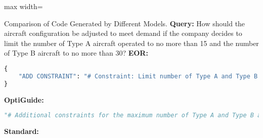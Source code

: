 \begin{figure*}[ht] \small
\begin{adjustbox}{max width=\textwidth}
\begin{AIbox}{Comparison of Code Generated by Different Models.}
{\bf Query:}
{\footnotesize
How should the aircraft configuration be adjusted to meet demand if the company decides to limit the number of Type A aircraft operated to no more than 15 and the number of Type B aircraft to no more than 30?
}
\tcbline
{\bf EOR:}
{\footnotesize
\begin{lstlisting}[language=Python]
{
    "ADD CONSTRAINT": "# Constraint: Limit number of Type A and Type B aircraft\nm.addConstr(aircraft_count['A'] <= 15, name=\"MaxTypeAConstraint\")\nm.addConstr(aircraft_count['B'] <= 30, name=\"MaxTypeBConstraint\")"
}
\end{lstlisting}
}
\tcbline
{\bf OptiGuide:}
{\footnotesize
\begin{lstlisting}[language=Python]
"# Additional constraints for the maximum number of Type A and Type B aircraft\nm.addConstr(aircraft_count['A'] <= 15, name=\"MaxAircraft_A\")\nm.addConstr(aircraft_count['B'] <= 30, name=\"MaxAircraft_B\")"
\end{lstlisting}
}
{\bf Standard:}
{\footnotesize
\begin{lstlisting}[language=Python]

\end{lstlisting}}
\end{AIbox}
\end{adjustbox}
\end{figure*}
